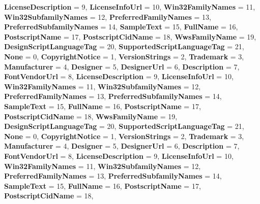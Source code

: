 \begin{DoxyCompactItemize}
{\bfseries License\+Description} = 9, 
{\bfseries License\+Info\+Url} = 10, 
{\bfseries Win32\+Family\+Names} = 11, 
\newline
{\bfseries Win32\+Subfamily\+Names} = 12, 
{\bfseries Preferred\+Family\+Names} = 13, 
{\bfseries Preferred\+Subfamily\+Names} = 14, 
{\bfseries Sample\+Text} = 15, 
\newline
{\bfseries Full\+Name} = 16, 
{\bfseries Postscript\+Name} = 17, 
{\bfseries Postscript\+Cid\+Name} = 18, 
{\bfseries Wws\+Family\+Name} = 19, 
\newline
{\bfseries Design\+Script\+Language\+Tag} = 20, 
{\bfseries Supported\+Script\+Language\+Tag} = 21, 
{\bfseries None} = 0, 
{\bfseries Copyright\+Notice} = 1, 
\newline
{\bfseries Version\+Strings} = 2, 
{\bfseries Trademark} = 3, 
{\bfseries Manufacturer} = 4, 
{\bfseries Designer} = 5, 
\newline
{\bfseries Designer\+Url} = 6, 
{\bfseries Description} = 7, 
{\bfseries Font\+Vendor\+Url} = 8, 
{\bfseries License\+Description} = 9, 
\newline
{\bfseries License\+Info\+Url} = 10, 
{\bfseries Win32\+Family\+Names} = 11, 
{\bfseries Win32\+Subfamily\+Names} = 12, 
{\bfseries Preferred\+Family\+Names} = 13, 
\newline
{\bfseries Preferred\+Subfamily\+Names} = 14, 
{\bfseries Sample\+Text} = 15, 
{\bfseries Full\+Name} = 16, 
{\bfseries Postscript\+Name} = 17, 
\newline
{\bfseries Postscript\+Cid\+Name} = 18, 
{\bfseries Wws\+Family\+Name} = 19, 
{\bfseries Design\+Script\+Language\+Tag} = 20, 
{\bfseries Supported\+Script\+Language\+Tag} = 21, 
\newline
{\bfseries None} = 0, 
{\bfseries Copyright\+Notice} = 1, 
{\bfseries Version\+Strings} = 2, 
{\bfseries Trademark} = 3, 
\newline
{\bfseries Manufacturer} = 4, 
{\bfseries Designer} = 5, 
{\bfseries Designer\+Url} = 6, 
{\bfseries Description} = 7, 
\newline
{\bfseries Font\+Vendor\+Url} = 8, 
{\bfseries License\+Description} = 9, 
{\bfseries License\+Info\+Url} = 10, 
{\bfseries Win32\+Family\+Names} = 11, 
\newline
{\bfseries Win32\+Subfamily\+Names} = 12, 
{\bfseries Preferred\+Family\+Names} = 13, 
{\bfseries Preferred\+Subfamily\+Names} = 14, 
{\bfseries Sample\+Text} = 15, 
\newline
{\bfseries Full\+Name} = 16, 
{\bfseries Postscript\+Name} = 17, 
{\bfseries Postscript\+Cid\+Name} = 18, 

\end{DoxyCompactItemize}
